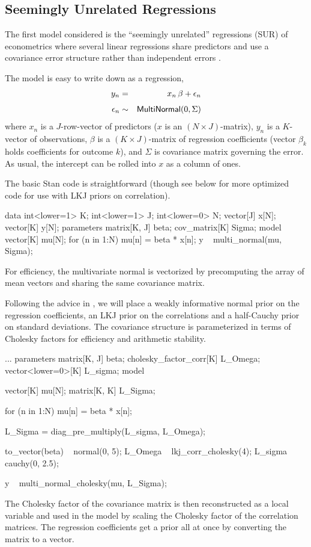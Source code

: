 \subsection{Seemingly Unrelated Regressions} 

The first model considered is the ``seemingly unrelated'' regressions
(SUR) of econometrics where several linear regressions share
predictors and use a covariance error structure rather than
independent errors \citep{Zellner:1962,Greene:2011}.

The model is easy to write down as a regression,
%
\begin{eqnarray*}
 y_n & = & x_n \, \beta + \epsilon_n
\\[4pt]
 \epsilon_n & \sim & \distro{MultiNormal}(0, \Sigma)
\end{eqnarray*}
%
where $x_n$ is a $J$-row-vector of predictors ($x$ is an $(N \times
J)$-matrix), $y_n$ is a $K$-vector of observations, $\beta$ is a $(K
\times J)$-matrix of regression coefficients (vector $\beta_k$ holds
coefficients for outcome $k$), and $\Sigma$ is covariance matrix
governing the error.  As usual, the intercept can be rolled into $x$
as a column of ones.

The basic Stan code is straightforward (though see below for more
optimized code for use with LKJ priors on correlation).
%
\begin{stancode}
data {
  int<lower=1> K;
  int<lower=1> J;
  int<lower=0> N;
  vector[J] x[N];
  vector[K] y[N];
}
parameters {
  matrix[K, J] beta;
  cov_matrix[K] Sigma;
}
model {
  vector[K] mu[N];
  for (n in 1:N)
    mu[n] = beta * x[n];
  y ~ multi_normal(mu, Sigma);
}
\end{stancode}
%
For efficiency, the multivariate normal is vectorized by precomputing
the array of mean vectors and sharing the same covariance matrix.

Following the advice in ,
we will place a weakly informative normal prior on the regression
coefficients, an LKJ prior on the correlations and a half-Cauchy prior
on standard deviations.  The covariance structure is parameterized in
terms of Cholesky factors for efficiency and arithmetic stability.
%
\begin{stancode}
...
parameters {
  matrix[K, J] beta;
  cholesky_factor_corr[K] L_Omega;
  vector<lower=0>[K] L_sigma;
}
model {
  vector[K] mu[N];
  matrix[K, K] L_Sigma;

  for (n in 1:N)
    mu[n] = beta * x[n];

  L_Sigma = diag_pre_multiply(L_sigma, L_Omega);

  to_vector(beta) ~ normal(0, 5);
  L_Omega ~ lkj_corr_cholesky(4);
  L_sigma ~ cauchy(0, 2.5);

  y ~ multi_normal_cholesky(mu, L_Sigma);
}
\end{stancode}
%
The Cholesky factor of the covariance matrix is then reconstructed as
a local variable and used in the model by scaling the Cholesky factor
of the correlation matrices. The regression coefficients get a prior
all at once by converting the matrix  to a vector.

